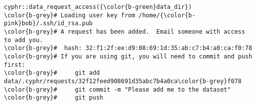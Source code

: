 \documentclass[class=minimal,border=0]{standalone}
\begin{document}
%
\begin{BVerbatim}[bgcolor=b-darkgrey]
cyphr::data_request_access({\color{b-green}data_dir})
\color{b-grey}# Loading user key from /home/{\color{b-pink}bob}/.ssh/id_rsa.pub
\color{b-grey}# A request has been added.  Email someone with access to add you.
\color{b-grey}#  hash: 32:f1:2f:ee:d9:08:69:1d:35:ab:c7:b4:a0:ca:f0:78
\color{b-grey}# If you are using git, you will need to commit and push first:
\color{b-grey}#     git add data/.cyphr/requests/32f12feed908691d35abc7b4a0ca\color{b-grey}f078
\color{b-grey}#     git commit -m "Please add me to the dataset"
\color{b-grey}#     git push
\end{BVerbatim}
\end{document}
